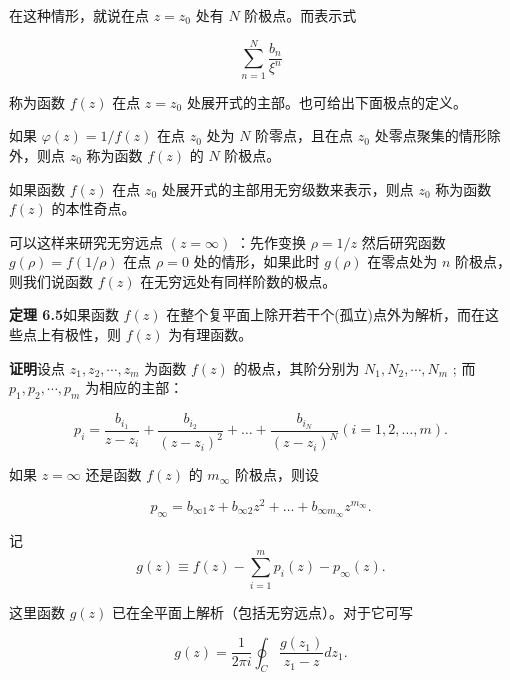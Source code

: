在这种情形，就说在点 $z = z_0$ 处有 $N$ 阶极点。而表示式

\begin{equation*}
\sum_ {n = 1} ^ {N} \frac {b _ {n}}{\xi^ {n}}
\end{equation*}

称为函数 $f(z)$ 在点 $z = z_0$ 处展开式的主部。也可给出下面极点的定义。

如果 $\varphi(z) = 1 / f(z)$ 在点 $z_0$ 处为 $N$ 阶零点，且在点 $z_0$ 处零点聚集的情形除外，则点 $z_0$ 称为函数 $f(z)$ 的 $N$ 阶极点。

如果函数 $f(z)$ 在点 $z_0$ 处展开式的主部用无穷级数来表示，则点 $z_0$ 称为函数 $f(z)$ 的本性奇点。

可以这样来研究无穷远点 $(z = \infty)$ ：先作变换 $\rho = 1 / z$ 然后研究函数 $g(\rho) = f(1 / \rho)$ 在点 $\rho = 0$ 处的情形，如果此时 $g(\rho)$ 在零点处为 $n$ 阶极点，则我们说函数 $f(z)$ 在无穷远处有同样阶数的极点。

\textbf{定理 6.5}\quad 如果函数 $f(z)$ 在整个复平面上除开若干个(孤立)点外为解析，而在这些点上有极性，则 $f(z)$ 为有理函数。

\textbf{证明}\quad 设点 $z_{1}, z_{2}, \cdots, z_{m}$ 为函数 $f(z)$ 的极点，其阶分别为 $N_{1}, N_{2}, \cdots, N_{m}$ ; 而 $p_{1}, p_{2}, \cdots, p_{m}$ 为相应的主部：

\begin{equation*}
p _ {i} = \frac {b _ {i _ {1}}}{z - z _ {i}} + \frac {b _ {i _ {2}}}{(z - z _ {i}) ^ {2}} + \dots + \frac {b _ {i _ {N}}}{(z - z _ {i}) ^ {N}} (i = 1, 2, \dots , m).
\end{equation*}

如果 $z = \infty$ 还是函数 $f(z)$ 的 $m_{\infty}$ 阶极点，则设

\begin{equation*}
p _ {\infty} = b _ {\infty 1} z + b _ {\infty 2} z ^ {2} + \dots + b _ {\infty m _ {\infty}} z ^ {m _ {\infty}}.
\end{equation*}

记
\begin{equation*}
g (z) \equiv f (z) - \sum_ {i = 1} ^ {m} p _ {i} (z) - p _ {\infty} (z).
\end{equation*}

这里函数 $g(z)$ 已在全平面上解析（包括无穷远点）。对于它可写

\begin{equation*}
g (z) = \frac {1}{2 \pi i} \oint_ {C} \frac {g (z _ {1})}{z _ {1} - z} d z _ {1}.
\end{equation*}

